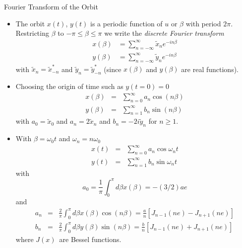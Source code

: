 \documentclass[size=11pt,style=paintings]{powerdot}
\begin{document}
  \begin{slide}{Fourier Transform of the Orbit}
 \begin{itemize}
 \item The orbit $x(t)$, $y(t)$ is a periodic function of $u$ or $\beta$ with period $2\pi$.
Restricting $\beta$ to \(-\pi \leqslant \beta \leqslant \pi\) we write the \textit{discrete Fourier transform}
\vskip -0.2cm
$$
\begin{aligned} x(\beta) &=\sum_{n=-\infty}^{\infty} \tilde{x}_{n} e^{-i n \beta} \\ y(\beta) &=\sum_{n=-\infty}^{\infty} \tilde{y}_{n} e^{-i n \beta} \end{aligned}
$$
with $\tilde{x}_{n}=\tilde{x}_{-n}^{*}$ and \(\tilde{y}_{n}=\tilde{y}_{-n}^{*}\) (since $x(\beta)$ and $y(\beta)$ are real functions).
\vskip 0.2cm
\item Choosing the origin of time such as $y(t=0)=0$
\vskip -0.4cm
\begin{eqnarray} x(\beta) &=&\sum_{n=0}^{\infty} a_{n} \cos (n \beta) \\
y(\beta)&=&\sum_{n=1}^{\infty} b_{n} \sin (n \beta)
\end{eqnarray}
\vskip -0.2cm
with \(a_{0}=\tilde{x}_{0}\) and
$a_{n}=2 \tilde{x}_{n}$
 and 
$b_{n}=-2 i \tilde{y}_{n}$
for $n\geq 1$.
\end{itemize}
 \end{slide}
 
  \begin{slide}{}
 \begin{itemize}
 \item With \(\beta=\omega_{0} t\) and \(\omega_{n}=n \omega_{0}\)
\begin{eqnarray}x(t)&=&\sum_{n=0}^{\infty} a_{n} \cos \omega_{n} t
\\ y(t)&=&\sum_{n=1}^{\infty} b_{n} \sin \omega_{n} t
\end{eqnarray}
with
$$
a_{0}=\frac{1}{\pi} \int_{0}^{\pi} d \beta x(\beta)=-(3 / 2) a e
$$
and
\begin{eqnarray}a_{n}&=&\frac{2}{\pi}\int_{0}^{\pi} d \beta x(\beta) \cos (n \beta) =\frac{a}{n}\left[J_{n-1}(n e)-J_{n+1}(n e)\right] \\
 b_{n}&=&\frac{2}{\pi} \int_{0}^{\pi} d \beta y(\beta) \sin (n \beta) =\frac{b}{n}\left[J_{n-1}(n e)+J_{n+1}(n e)\right]
\end{eqnarray}
where $J(x)$\ are Bessel functions.

 \end{itemize}
 \end{slide}
 
\end{document}
